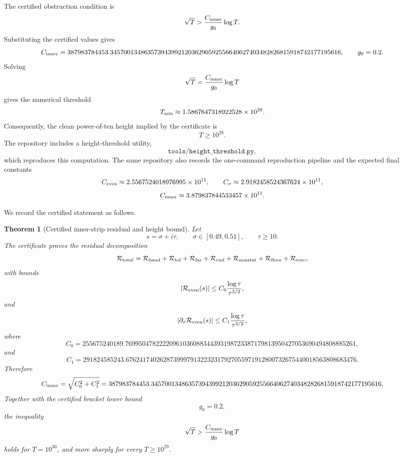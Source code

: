 \documentclass[11pt]{article}
\newtheorem{theorem}{Theorem}[section]
\newcommand{\code}[1]{\texttt{#1}}
\begin{document}
The certified obstruction condition is
\[
        \sqrt T>
        \frac{C_{\rm inner}}{g_0}\log T.
\]
Substituting the certified values gives
\[
        C_{\rm inner}
        =
        387983784453.34570013486357394399212036290592556640627403482826815918742177195616,
        \qquad
        g_0=0.2.
\]
Solving
\[
        \sqrt T=
        \frac{C_{\rm inner}}{g_0}\log T
\]
gives the numerical threshold
\[
        T_{\rm min}
        \approx
        1.5867647318922528\times10^{28}.
\]
Consequently, the clean power-of-ten height implied by the certificate is
\[
        T\ge10^{29}.
\]
The repository includes a height-threshold utility,
\[
        \code{tools/height\_threshold.py},
\]
which reproduces this computation.  The same repository also records the
one-command reproduction pipeline and the expected final constants
\[
        C_{\rm even}\approx2.5567524018976995\times10^{11},
        \qquad
        C_{\sigma}\approx2.9182458524367624\times10^{11},
\]
\[
        C_{\rm inner}\approx3.879837844533457\times10^{11}.
\]

We record the certified statement as follows.

\begin{theorem}[Certified inner-strip residual and height bound]
Let
\[
        s=\sigma+i\tau,
        \qquad
        \sigma\in[0.49,0.51],
        \qquad
        \tau\ge10.
\]
The certificate proves the residual decomposition
\[
        \mathcal R_{\rm total}
        =
        \mathcal R_{\rm band}
        +
        \mathcal R_{\rm bd}
        +
        \mathcal R_{\rm far}
        +
        \mathcal R_{\rm end}
        +
        \mathcal R_{\rm nonstat}
        +
        \mathcal R_{\rm floor}
        +
        \mathcal R_{\rm core},
\]
with bounds
\[
        |\mathcal R_{\rm even}(s)|
        \le
        C_0\frac{\log\tau}{\tau^{3/2}},
\]
and
\[
        |\partial_\sigma\mathcal R_{\rm even}(s)|
        \le
        C_1\frac{\log\tau}{\tau^{3/2}},
\]
where
\[
        C_0
        =
        255675240189.76995047822220961036088344393198723387179813950427053690494808885261,
\]
and
\[
        C_1
        =
        291824585243.67624174026287399979132232317927055971912800732675440018563808683476.
\]
Therefore
\[
        C_{\rm inner}
        =
        \sqrt{C_0^2+C_1^2}
        =
        387983784453.34570013486357394399212036290592556640627403482826815918742177195616.
\]
Together with the certified bracket lower bound
\[
        g_0=0.2,
\]
the inequality
\[
        \sqrt T>
        \frac{C_{\rm inner}}{g_0}\log T
\]
holds for \(T=10^{30}\), and more sharply for every \(T\ge10^{29}\).
\end{theorem}
\end{document}
